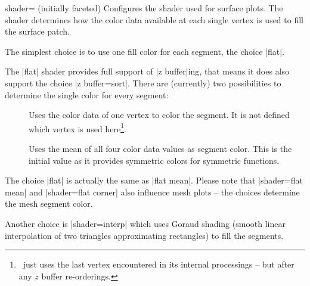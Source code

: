 \begin{pgfplotskey}{shader= (initially faceted)}
	Configures the shader used for surface plots. The shader determines how the color data available at each single vertex is used to fill the surface patch.

	The simplest choice is to use one fill color for each segment, the choice |flat|.

\pgfplotsexpensiveexample
\begin{codeexample}[]
\end{codeexample}

	\noindent The |flat| shader provides full support of |z buffer|ing, that means it does also support the choice |z buffer=sort|. There are (currently) two possibilities to determine the single color for every segment:
	\begin{description}
		\item[] Uses the color data of one vertex to color the segment. It is not defined which vertex is used here\footnote{\PGFPlots\ just uses the last vertex encountered in its internal processings -- but after any $z$ buffer re-orderings.}.

		\item[] Uses the mean of all four color data values as segment color. This is the initial value as it provides symmetric colors for symmetric functions.
	\end{description}
	The choice |flat| is actually the same as |flat mean|. Please note that |shader=flat mean| and |shader=flat corner| also influence mesh plots -- the choices determine the mesh segment color.

	Another choice is |shader=interp| which uses Goraud shading (smooth linear interpolation of two triangles approximating rectangles) to fill the segments. 

\pgfplotsexpensiveexample
\begin{codeexample}[]
\end{codeexample}


\end{pgfplotskey}
